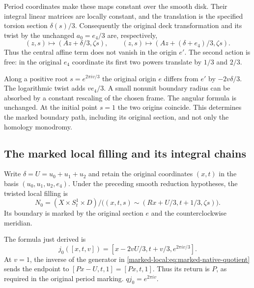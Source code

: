 Period coordinates make these maps constant over the smooth disk.
Their integral linear matrices are locally constant, and the translation
is the specified torsion section $\delta(s)/3$.
Consequently the original deck transformation and its twist by
the unchanged $a_0=e_4/3$ are, respectively,
\begin{equation}\label{marked-local:eq:actual-affine-actions}
 (z,s)\longmapsto(Az+\delta/3,\zeta s),\qquad
 (z,s)\longmapsto(Az+(\delta+e_4)/3,\zeta s).
\end{equation}
Thus the central affine term does not vanish in the origin $e'$.
The second action is free: in the original $e_4$ coordinate its
first two powers translate by $1/3$ and $2/3$.

Along a positive root $s=e^{2\pi iv/3}$ the original origin $e$
differs from $e'$ by $-2v\delta/3$. The logarithmic twist adds
$ve_4/3$. A small nonunit boundary radius can be absorbed by a
constant rescaling of the chosen frame. The angular formula is
unchanged. At the initial point $s=1$ the two origins coincide.
This determines the marked boundary path, including its original
section, and not only the homology monodromy.

\subsection{The marked local filling and its integral chains}

Write $\delta=U=u_0+u_1+u_2$ and retain the original coordinates
$(x,t)$ in the basis $(u_0,u_1,u_2,e_4)$. Under the preceding
smooth reduction hypotheses, the twisted local filling is
\begin{equation}\label{marked-local:eq:marked-native-quotient}
 N_0=(X\times S^1_t\times D)/
 \bigl((x,t,s)\sim(Rx+U/3,t+1/3,\zeta s)\bigr).
\end{equation}
Its boundary is marked by the original section $e$ and the
counterclockwise meridian.

The formula just derived is
\begin{equation}\label{marked-local:eq:marked-native-j}
 j_0([x,t,v])=[x-2vU/3,t+v/3,e^{2\pi iv/3}].
\end{equation}
At $v=1$, the inverse of the generator in
\eqref{marked-local:eq:marked-native-quotient} sends the endpoint to
$[Px-U,t,1]=[Px,t,1]$. Thus its return is $P$, as required in
the original period marking. $qj_0=e^{2\pi iv}$.

